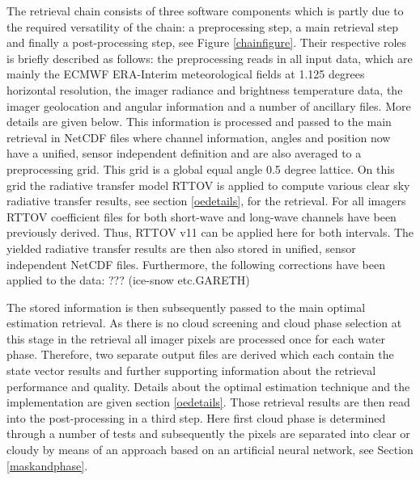 \documentclass[amt]{style/copernicus}
\begin{document}


The retrieval chain consists of three software components which is partly due
to the required versatility of the chain: a preprocessing step, a main
retrieval step and finally a post-processing step, see Figure
\ref{chainfigure}. Their respective roles is briefly described as follows: the
preprocessing reads in all input data, which are mainly the ECMWF ERA-Interim
meteorological fields at 1.125 degrees horizontal resolution, the imager
radiance and brightness temperature data, the imager geolocation and angular
information and a number of ancillary files. More details are given
below. This information is processed and passed to the main retrieval in
NetCDF files where channel information, angles and position now have a
unified, sensor independent definition and are also averaged to a
preprocessing grid. This grid is a global equal angle 0.5 degree lattice. On
this grid the radiative transfer model RTTOV \citep{RTTOV_web} is applied to compute various clear sky radiative transfer results, see section \ref{oedetails}, for the retrieval. For all imagers RTTOV coefficient files for both short-wave and long-wave channels have been previously derived. Thus, RTTOV v11 can be applied here for both intervals. The yielded radiative transfer results are then also stored in unified, sensor independent NetCDF files. Furthermore, the following corrections have been applied to the data: ??? (ice-snow etc.GARETH)

The stored information is then subsequently passed to the main optimal estimation retrieval. As there is no cloud screening and cloud phase selection at this stage in the retrieval all imager pixels are processed once for each water phase. Therefore, two separate output files are derived which each contain the state vector results and further supporting information about the retrieval performance and quality. Details about the optimal estimation technique and the implementation are given section \ref{oedetails}. Those retrieval results are then read into the post-processing in a third step. Here first cloud phase is determined through a number of tests and subsequently the pixels are separated into clear or cloudy by means of an approach based on an artificial neural network, see Section \ref{maskandphase}. 
\end{document}

